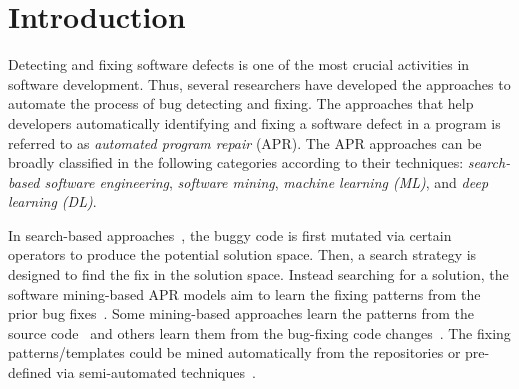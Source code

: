 \section{Introduction}


Detecting and fixing software defects is one of the most crucial
activities in software development. Thus, several researchers have
developed the approaches to automate the process of bug detecting and
fixing. The approaches that help developers automatically identifying
and fixing a software defect in a program is referred to as {\em
  automated program repair} (APR). The APR approaches can be broadly
classified in the following categories according to their techniques:
{\em search-based software engineering}, {\em software mining}, {\em
  machine learning (ML)}, and {\em deep learning (DL)}.

In search-based
  approaches~\cite{LeGoues-icse12,le2011genprog,martinez2016astor,qi2014strength},
the buggy code is first mutated via certain operators to produce the
potential solution space. Then, a search strategy is designed to find
the fix in the solution space. Instead searching for a solution, the
software mining-based APR models aim to learn the fixing patterns from
the prior bug
fixes~\cite{kim2013automatic,le2016history,liu2019avatar,tbar-issta19,nguyen2013semfix,
  icse10,ray-fse12}. Some mining-based approaches learn the patterns
from the source code~\cite{liu2019avatar,tbar-issta19} and others
learn them from the bug-fixing code
changes~\cite{wen2018context,Simfix,koyuncu2018fixminer}.  The fixing
patterns/templates could be mined automatically from the repositories
or pre-defined via semi-automated
techniques~\cite{le2016history,nguyen2013semfix,liu2019avatar,tbar-issta19}.

